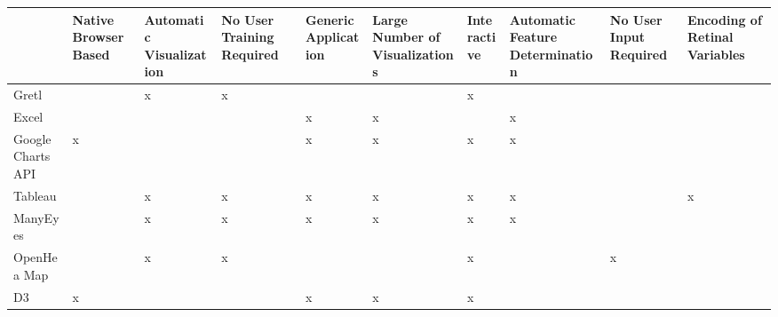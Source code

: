 \documentclass[a4paper, 11pt, titlepage, onehalfspacing]{report}
\begin{document}
    \begin{sidewaystable}
    \small
    \begin{tabularx}{\textwidth}{>{\centering}X|>{\centering}X|>{\centering}X|>{\centering}X|>{\centering}X|>{\centering}X|>{\centering}X|>{\centering}X|>{\centering}X|>{\centering\arraybackslash}X}
    ~                 & Native Browser Based & Automatic Visualization & No User Training Required & Generic Application & Large Number of Visualizations & Interactive & Automatic Feature Determination & No User Input Required & Encoding of Retinal Variables \\ \hline
    Gretl             & ~                    & x                       & x                         & ~                   & ~                              & x           & ~                               & ~                      & ~                             \\ \hline
    Excel             & ~                    & ~                       & ~                         & x                   & x                              & ~           & x                               & ~                      & ~                             \\ \hline
    Google Charts API & x                    & ~                       & ~                         & x                   & x                              & x           & x                               & ~                      & ~                             \\ \hline
    Tableau           & ~                    & x                       & x                         & x                   & x                              & x           & x                               & ~                      & x                             \\ \hline
    ManyEyes          & ~                    & x                       & x                         & x                   & x                              & x           & x                               & ~                      & ~                             \\ \hline
    OpenHea Map       & ~                    & x                       & x                         & ~                   & ~                              & x           & ~                               & x                      & ~                             \\ \hline
    D3                & x                    & ~                       & ~                         & x                   & x                              & x           & ~                               & ~                      & ~                             \\ \hline

\end{tabularx}
\end{sidewaystable}
\end{document}
